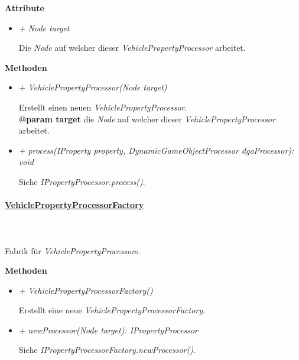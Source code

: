         \textbf{Attribute}
        \begin{itemize}
            \item \textit{+ Node target}
                \begin{leftbar}[0.9\linewidth]
                    Die \textit{Node} auf welcher dieser \textit{VehiclePropertyProcessor} arbeitet.
                \end{leftbar}
        \end{itemize}
        \textbf{Methoden}
        \begin{itemize}
            \item \textit{+ VehiclePropertyProcessor(Node target)}
                \begin{leftbar}[0.9\linewidth]
                    Erstellt einen neuen \textit{VehiclePropertyProcessor}.\\
                    \textbf{@param target} die \textit{Node} auf welcher dieser \textit{VehiclePropertyProcessor} arbeitet.
                \end{leftbar}
            \item \textit{+ process(IProperty property, DynamicGameObjectProcessor dgoProcessor): void}
                \begin{leftbar}[0.9\linewidth]
                    Siehe \textit{IPropertyProcessor.process()}.
                \end{leftbar}
        \end{itemize}

    \pagebreak
    \paragraph{\underline{VehiclePropertyProcessorFactory}} \mbox{}\\
    \\
    Fabrik für \textit{VehiclePropertyProcessor}s.\par

        \textbf{Methoden}
        \begin{itemize}
            \item \textit{+ VehiclePropertyProcessorFactory()}
                \begin{leftbar}[0.9\linewidth]
                    Erstellt eine neue \textit{VehiclePropertyProcessorFactory}.
                \end{leftbar}
            \item \textit{+ newProcessor(Node target): IPropertyProcessor}
                \begin{leftbar}[0.9\linewidth]
                    Siehe \textit{IPropertyProcessorFactory.newProcessor()}.
                \end{leftbar}
        \end{itemize}

